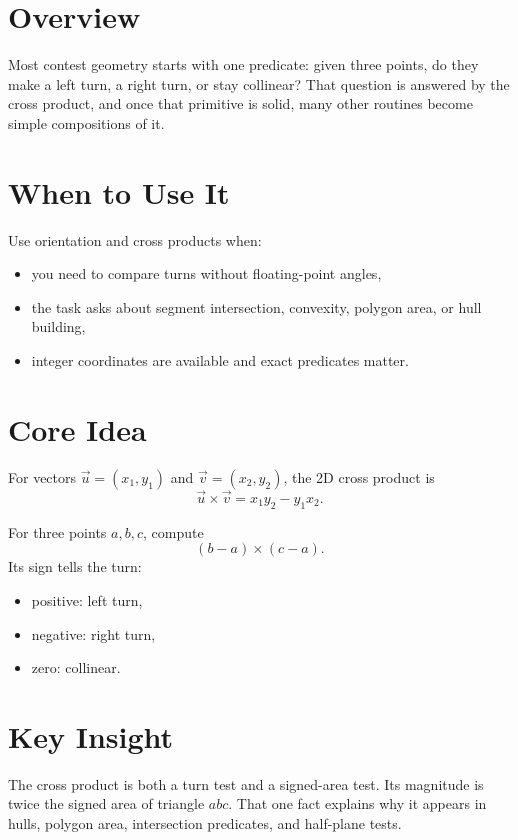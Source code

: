 \section*{Overview}

Most contest geometry starts with one predicate: given three points, do they make a left turn, a right turn, or stay
collinear? That question is answered by the cross product, and once that primitive is solid, many other routines become
simple compositions of it.

\section*{When to Use It}

Use orientation and cross products when:

\begin{itemize}
  \item you need to compare turns without floating-point angles,
  \item the task asks about segment intersection, convexity, polygon area, or hull building,
  \item integer coordinates are available and exact predicates matter.
\end{itemize}

\section*{Core Idea}

For vectors \(\vec{u} = (x_1, y_1)\) and \(\vec{v} = (x_2, y_2)\), the 2D cross product is
\[
\vec{u} \times \vec{v} = x_1 y_2 - y_1 x_2.
\]

For three points \(a, b, c\), compute
\[
(b - a) \times (c - a).
\]
Its sign tells the turn:
\begin{itemize}
  \item positive: left turn,
  \item negative: right turn,
  \item zero: collinear.
\end{itemize}

\section*{Key Insight}

The cross product is both a turn test and a signed-area test. Its magnitude is twice the signed area of triangle
\(abc\). That one fact explains why it appears in hulls, polygon area, intersection predicates, and half-plane tests.

